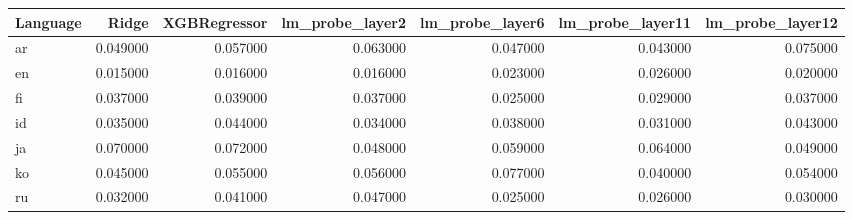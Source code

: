 \begin{tabular}{lrrrrrr}
\toprule
Language & Ridge & XGBRegressor & lm_probe_layer2 & lm_probe_layer6 & lm_probe_layer11 & lm_probe_layer12 \\
\midrule
ar & 0.049000 & 0.057000 & 0.063000 & 0.047000 & 0.043000 & 0.075000 \\
en & 0.015000 & 0.016000 & 0.016000 & 0.023000 & 0.026000 & 0.020000 \\
fi & 0.037000 & 0.039000 & 0.037000 & 0.025000 & 0.029000 & 0.037000 \\
id & 0.035000 & 0.044000 & 0.034000 & 0.038000 & 0.031000 & 0.043000 \\
ja & 0.070000 & 0.072000 & 0.048000 & 0.059000 & 0.064000 & 0.049000 \\
ko & 0.045000 & 0.055000 & 0.056000 & 0.077000 & 0.040000 & 0.054000 \\
ru & 0.032000 & 0.041000 & 0.047000 & 0.025000 & 0.026000 & 0.030000 \\
\bottomrule
\end{tabular}

